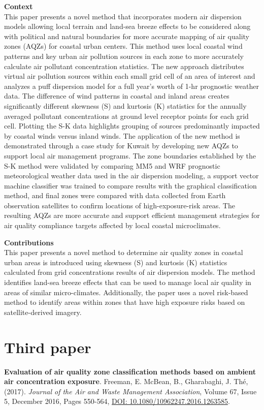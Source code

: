 \vspace{5mm}
\noindent
\textbf{Context}\\
\noindent
This paper presents a novel method that incorporates modern air dispersion models allowing local terrain and land-sea breeze effects to be considered along with political and natural boundaries for more accurate mapping of air quality zones (AQZs) for coastal urban centers. This method uses local coastal wind patterns and key urban air pollution sources in each zone to more accurately calculate air pollutant concentration statistics. The new approach distributes virtual air pollution sources within each small grid cell of an area of interest and analyzes a puff dispersion model for a full year’s worth of 1-hr prognostic weather data. The difference of wind patterns in coastal and inland areas creates significantly different skewness (S) and kurtosis (K) statistics for the annually averaged pollutant concentrations at ground level receptor points for each grid cell. Plotting the S-K data highlights grouping of sources predominantly impacted by coastal winds versus inland winds. The application of the new method is demonstrated through a case study for Kuwait by developing new AQZs to support local air management programs. The zone boundaries established by the S-K method were validated by comparing MM5 and WRF prognostic meteorological weather data used in the air dispersion modeling, a support vector machine classifier was trained to compare results with the graphical classification method, and final zones were compared with data collected from Earth observation satellites to confirm locations of high-exposure-risk areas. The resulting AQZs are more accurate and support efficient management strategies for air quality compliance targets affected by local coastal microclimates.

\vspace{5mm}
\noindent
\textbf{Contributions}\\
\noindent
This paper presents a novel method to determine air quality zones in coastal urban areas is introduced using skewness (S) and kurtosis (K) statistics calculated from grid concentrations results of air dispersion models.  The method identifies land-sea breeze effects that can be used to manage local air quality in areas of similar micro-climates. Additionally, the paper uses a novel risk-based method to identify areas within zones that have high exposure risks based on satellite-derived imagery.

\section{Third paper}
\noindent
\textbf{Evaluation of air quality zone classification methods based on ambient air concentration exposure}. Freeman, E. McBean, B., Gharabaghi, J.  Th\'e, (2017). \textit{Journal of the Air and Waste Management Association}, Volume 67, Issue 5, December 2016, Pages 550-564, \url{DOI: 10.1080/10962247.2016.1263585}.

